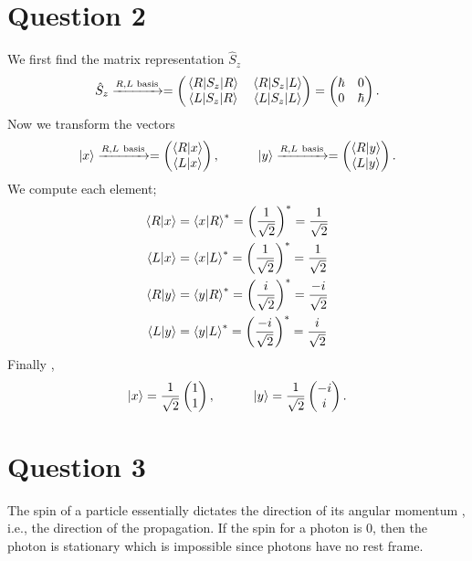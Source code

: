 \documentclass[
	12pt,
	]{article}
\theoremstyle{definition}
\theoremstyle{definition}
\theoremstyle{definition}
\theoremstyle{definition}
\theoremstyle{definition}
\theoremstyle{example}
\theoremstyle{note}
\theoremstyle{remark}
\theoremstyle{example}
\begin{document}
		\section*{Question 2}
		We first find the matrix representation	$\hat{S}_{z}$
		$$ \hat{S}_{z} \xrightarrow{R, L \text{ basis}} = \begin{pmatrix}
			\mel{R}{S_{z}}{R} & \mel{R}{S_{z}}{L} \\ 
			\mel{L}{S_{z}}{R} & \mel{L}{S_{z}}{L}
		\end{pmatrix} = \begin{pmatrix}
			\hbar & 0 \\ 0 & \hbar
		\end{pmatrix}.$$
		Now we transform the vectors 
		$$ \ket{x} \xrightarrow{R, L \ \text{basis}} = \begin{pmatrix}
			\braket{R}{x} \\ \braket{L}{x}
		\end{pmatrix}, \qquad \quad \ket{y} \xrightarrow{R, L \ \text{basis}} = \begin{pmatrix}
		\braket{R}{y} \\ \braket{L}{y}
		\end{pmatrix}.$$
		We compute each element; 
		\begin{align*}
			\braket{R}{x} &= \braket{x}{R}^{\ast} = \left(\frac{1}{\sqrt{2}}\right)^{\ast } = \frac{1}{\sqrt{2}} \\
			\braket{L}{x} &= \braket{x}{L}^{\ast} = \left(\frac{1}{\sqrt{2}}\right)^{\ast } = \frac{1}{\sqrt{2}} \\
			\braket{R}{y} &= \braket{y}{R}^{\ast} = \left(\frac{i}{\sqrt{2}}\right)^{\ast } = \frac{-i}{\sqrt{2}} \\
			\braket{L}{y} &= \braket{y}{L}^{\ast} = \left(\frac{-i}{\sqrt{2}}\right)^{\ast } = \frac{i}{\sqrt{2}} \\
		\end{align*}
		Finally ,
		$$ \ket{x} = \frac{1}{\sqrt{2}} \begin{pmatrix}
			1 \\ 1
		\end{pmatrix} , \qquad \quad \ket{y} = \frac{1}{\sqrt{2}} \begin{pmatrix}
		 -i \\ i 
		\end{pmatrix}.$$
	\section*{Question 3}
		The spin of a particle essentially dictates the direction of its angular momentum , i.e., the direction of the propagation. If the spin for a photon is $0$, then the photon is stationary which is impossible since photons have no rest frame.
\end{document}
